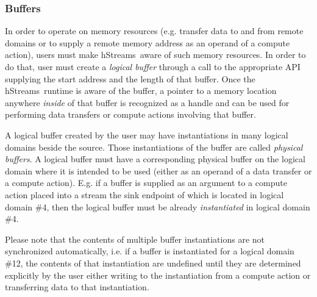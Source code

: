 \documentclass[a4,oneside]{book}
\newcommand{\hstreams}{hStreams}
\begin{document}
\subsubsection{Buffers}
In order to operate on memory resources (e.g. transfer data to and from remote domains or to supply a remote memory address as an operand of a compute action), users must make \hstreams\ aware of such memory resources.
In order to do that, user must create a \emph{logical buffer} through a call to the appropriate API supplying the start address and the length of that buffer.
Once the \hstreams\ runtime is aware of the buffer, a pointer to a memory location anywhere \emph{inside} of that buffer is recognized as a handle and can be used for performing data transfers or compute actions involving that buffer.

A logical buffer created by the user may have instantiations in many logical domains beside the source.
Those instantiations of the buffer are called \emph{physical buffers}.
A logical buffer must have a corresponding physical buffer on the logical domain where it is intended to be used (either as an operand of a data transfer or a compute action).
E.g. if a buffer is supplied as an argument to a compute action placed into a stream the sink endpoint of which is located in logical domain \#4, then the logical buffer must be already \emph{instantiated} in logical domain \#4.

Please note that the contents of multiple buffer instantiations are not synchronized automatically, i.e. if a buffer is instantiated for a logical domain \#12, the contents of that instantiation are undefined until they are determined explicitly by the user either writing to the instantiation from a compute action or transferring data to that instantiation.
\end{document}
